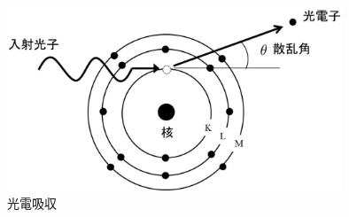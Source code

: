 \begin{figure}[H]
 \begin{center}
 \includegraphics[width=10cm]{image/other/photo_ab.eps}
 \end{center}
 \caption{光電吸収}
 \label{fig:photo_ab}
\end{figure}

